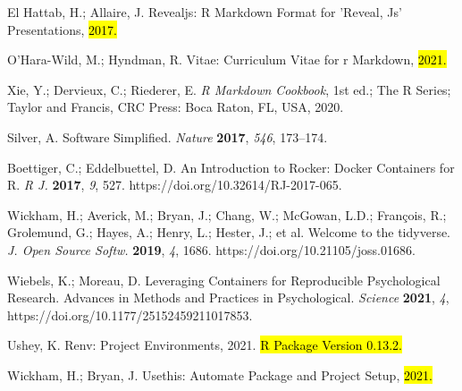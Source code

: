 \documentclass[psych,tutorial,accept,moreauthors,pdftex]{Definitions/mdpi}
\begin{document}
\begin{thebibliography}{999}
El Hattab, H.; Allaire, J. Revealjs: R Markdown Format for ’Reveal, Js’ Presentations, \hl{2017.}%


O’Hara-Wild, M.; Hyndman, R. Vitae: Curriculum Vitae for r Markdown, \hl{2021.}%


Xie, Y.; Dervieux, C.; Riederer, E. \emph{R Markdown Cookbook}, 1st ed.; The R Series; Taylor and Francis, CRC Press: Boca Raton, FL, USA, 2020.


Silver, A. Software Simplified. \emph{Nature} \textbf{2017}, \emph{546}, 173--174.

Boettiger, C.; Eddelbuettel, D. An Introduction to Rocker: Docker Containers for R. \emph{R J.} \textbf{2017}, \emph{9}, 527. https://doi.org/10.32614/RJ-2017-065.

Wickham, H.; Averick, M.; Bryan, J.; Chang, W.; McGowan, L.D.; François, R.; Grolemund, G.; Hayes, A.; Henry, L.; Hester, J.; et al. Welcome to the tidyverse. \emph{J. Open Source Softw.} \textbf{2019}, \emph{4}, 1686. https://doi.org/10.21105/joss.01686.

Wiebels, K.; Moreau, D. Leveraging Containers for Reproducible Psychological Research. Advances in Methods and Practices in Psychological. \emph{Science} \textbf{2021}, \emph{4}, https://doi.org/10.1177/25152459211017853.


Ushey, K. Renv: Project Environments, 2021. \hl{R Package Version 0.13.2.}%


Wickham, H.; Bryan, J. Usethis: Automate Package and Project Setup, \hl{2021.}%



\end{thebibliography}
\end{document}
